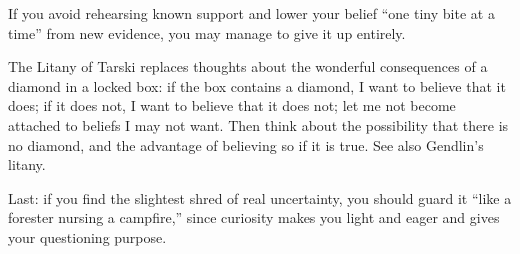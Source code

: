 If you avoid rehearsing known support and lower your belief ``one tiny bite at a time'' from new evidence, you may manage to give it up entirely. 

The Litany of Tarski replaces thoughts about the wonderful consequences of a diamond in a locked box: if the box contains a diamond, I want to believe that it does; if it does not, I want to believe that it does not; let me not become attached to beliefs I may not want. Then think about the possibility that there is no diamond, and the advantage of believing so if it is true. See also Gendlin's litany.

Last: if you find the slightest shred of real uncertainty, you should guard it ``like a forester nursing a campfire,'' since curiosity makes you light and eager and gives your questioning purpose.
